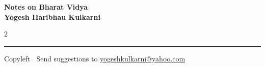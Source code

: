 \documentclass[9pt,a4paper,landscape]{article}
\begin{document}
\footnotesize


\begin{center}
\Large{\textbf{Notes on Bharat Vidya\\ Yogesh Haribhau Kulkarni}}  
\end{center}

\begin{multicols}{2}

\end{multicols}

\rule{\linewidth}{0.25pt}
\scriptsize
Copyleft \textcopyleft\  Send suggestions to 
\href{http://www.yogeshkulkarni.com}{yogeshkulkarni@yahoo.com}
\end{document}

